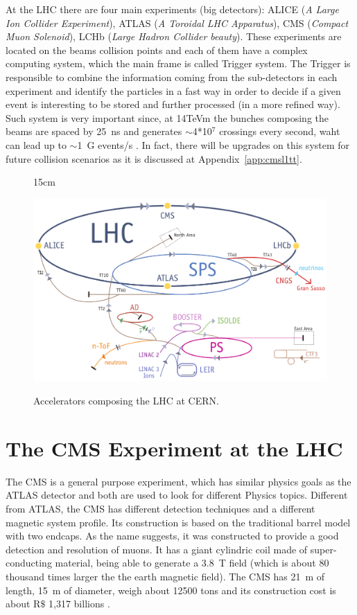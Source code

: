 At the LHC there are four main experiments (big detectors): ALICE (\textit{A Large Ion Collider Experiment}), ATLAS (\textit{A Toroidal LHC Apparatus}), CMS (\textit{Compact Muon Solenoid}), LCHb (\textit{Large Hadron Collider beauty}). These experiments are located on the beams collision points and each of them have a complex computing system, which the main frame is called Trigger system. The Trigger is responsible to combine the information coming from the sub-detectors in each experiment and identify the particles in a fast way in order to decide if a given event is interesting to be stored and further processed (in a more refined way). Such system is very important since, at 14TeVm the bunches composing the beams are spaced by 25~ns and generates $\sim$4*10$^{7}$ crossings every second, waht can lead up to $\sim$1~G events/s \cite{bib:JINST-3-362-2008, bib:lhc-guide}. In fact, there will be upgrades on this system for future collision scenarios as it is discussed at Appendix~\ref{app:cmsl1tt}.

\begin{figure}[htbp]{15cm}
\caption{Accelerators composing the LHC at CERN.}
\includegraphics[scale=0.35]{ChapterCMS/figs/lhc_parts.png}
\label{fig:LHC_parts}
\end{figure}

\section{The CMS Experiment at the LHC}
The CMS is a general purpose experiment, which has similar physics goals as the ATLAS detector and both are used to look for different Physics topics. Different from ATLAS, the CMS has different detection techniques and a different magnetic system profile. Its construction is based on the traditional barrel model with two endcaps. As the name suggests, it was constructed to provide a good detection and resolution of muons. It has a giant cylindric coil made of super-conducting material, being able to generate a 3.8~T field (which is about 80 thousand times larger the the earth magnetic field). The CMS has 21~m of length, 15~m of diameter, weigh about 12500 tons and its construction cost is about R$\$$ 1,317 billions \cite{bib:lhc-guide,bib:cms-page}.

